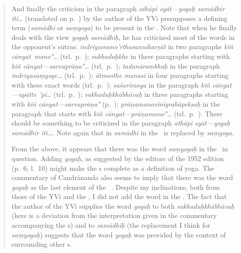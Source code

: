 \begin{quotation}
{		And finally the criticism in the paragraph \emph{athāpi syāt---yogaḥ samādhir iti\ldots}  (translated on p.~\pageref{ATHPSY1}) by the author of the YVi presupposes a defining term (\emph{samādhi\/} or \emph{saṃyoga}) to be present in the \sutra.  Note that when he finally deals with the view \emph{yogaḥ samādhiḥ}, he has criticized most of the words in the opponent's sūtras:  \emph{indriyamano'rthasannikarṣāt} in two paragraphs \emph{kiñ cānyat\dd\ mano°\ldots}  (trl.\ p.~\pageref{KCMN1}); \emph{sukhaduḥkhe} in three paragraphs starting with \emph{kiñ cānyat---sa\-rva\-prāṇa°\ldots}  (trl.\ p.~\pageref{SRVPRNBH1}); \emph{tadanārambhaḥ} in the paragraph \emph{indriyasaṃyoge\ldots}  (trl.\ p.~\pageref{INDRYSMYG1}); \emph{ātmasthe manasi} in four paragraphs starting with these exact words  (trl.\ p.~\pageref{ATMSTH1}); \emph{saśarīrasya} in the paragraph \emph{kiñ cānyat---upātte 'pi\ldots}  (trl.\ p.~\pageref{UPTTP1}); \emph{sukhaduḥkhābhāvaḥ} in three paragraphs starting with \emph{kiñ cānyat---sarvaprāṇa°}  (p.~\pageref{SRVPRNBH1}); \emph{prāṇamanovinigrahāpekṣaḥ} in the paragraph that starts with \emph{kiñ cānyat---prāṇamano°\ldots}  (trl.\ p.~\pageref{KCPRMN1}).  There should be something to be criticized in the paragraph \emph{athāpi syāt---yogaḥ samādhir iti\ldots}.  Note again that in  \emph{samādhi\/} in the \sutra\ is replaced by \emph{saṃyoga}.%

		From the above, it appears that there was the word \emph{saṃyogaḥ} in the \sutra\ in question.  Adding \emph{yogaḥ}, as suggested by the editors of the 1952 edition (p.~6, l.~10) might make the \sutra s complete as a definition of yoga.  The commentary of Candrānanda also seems to imply that there was the word \emph{yogaḥ} as the last element of the \sutra\ \citep[42,24]{vs}.  Despite my inclinations, both from those of the YVi and the \VS, I did not add the word in the \sutra.  The fact that the author of the YVi supplies the word \emph{yogaḥ} to both \emph{sukhaduḥkhābhāvaḥ} (here is a deviation from the interpretation given in the commentary accompanying the \sutra s) and to \emph{samādhiḥ} (the replacement I think for \emph{saṃyogaḥ}) suggests that the word \emph{yogaḥ} was provided by the context of surrounding other \sutra s.%
		} %
        

\end{quotation}
